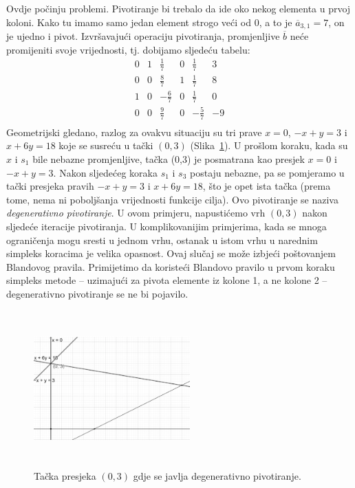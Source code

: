 \documentclass[a4paper, utf8, 11pt, colorlinks]{book}
\theoremstyle{definition}
\begin{document}
Ovdje počinju problemi. Pivotiranje bi trebalo da ide oko nekog elementa u prvoj koloni. Kako tu imamo samo jedan element strogo veći od 0, a to je $\overline{a}_{3,1}=7$, on je ujedno i pivot. Izvršavajući operaciju pivotiranja, promjenljive $\overline{b}$ neće promijeniti svoje vrijednosti, tj. dobijamo sljedeću tabelu:
$$\begin{array}{ccccc|c}
     0 & 1 & \frac{1}{7}  & 0 & \frac{1}{7} & 3 \\
     0 & 0 & \frac{8}{7}  & 1 & \frac{1}{7} & 8 \\
     1 & 0 & -\frac{6}{7} & 0 & \frac{1}{7} & 0 \\ \hline
     0 & 0 & \frac{9}{7}  & 0 & -\frac{5}{7} & -9 \\
\end{array}$$
Geometrijski gledano, razlog za ovakvu situaciju su tri prave $x=0$, $-x+y=3$ i $x+6y=18$ koje se susreću u tački $(0,3)$ (Slika~\ref{fig:deg-sol}). U prošlom koraku, kada su $x$ i $s_1$ bile nebazne promjenljive, tačka (0,3) je posmatrana kao presjek $x=0$ i $-x +y =3$. Nakon sljedećeg koraka $s_1$ i $s_3$ postaju nebazne, pa se pomjeramo u tački presjeka pravih 
$-x+y=3$ i $x+6y=18$, što je opet ista tačka (prema tome, nema ni poboljšanja vrijednosti funkcije cilja). 
 Ovo pivotiranje se naziva \emph{degenerativno pivotiranje}. U ovom primjeru, napustićemo vrh $(0,3)$ nakon sljedeće iteracije  pivotiranja. U komplikovanijim primjerima, kada se mnoga ograničenja mogu sresti u jednom vrhu, ostanak u istom vrhu u narednim simpleks koracima je velika opasnost. Ovaj slučaj se može izbjeći poštovanjem 
 Blandovog pravila. Primijetimo da koristeći Blandovo pravilo u prvom koraku simpleks metode -- uzimajući za pivota elemente iz kolone 1, a ne kolone 2 --  degenerativno pivotiranje se ne bi pojavilo.  


\begin{figure}[!ht]
	\centering
	\includegraphics[width=170pt,height=170pt]{deg-sol.eps}
	\caption{Tačka presjeka $(0,3)$ gdje se javlja degenerativno pivotiranje.}
	\label{fig:deg-sol}
\end{figure}
\end{document}
